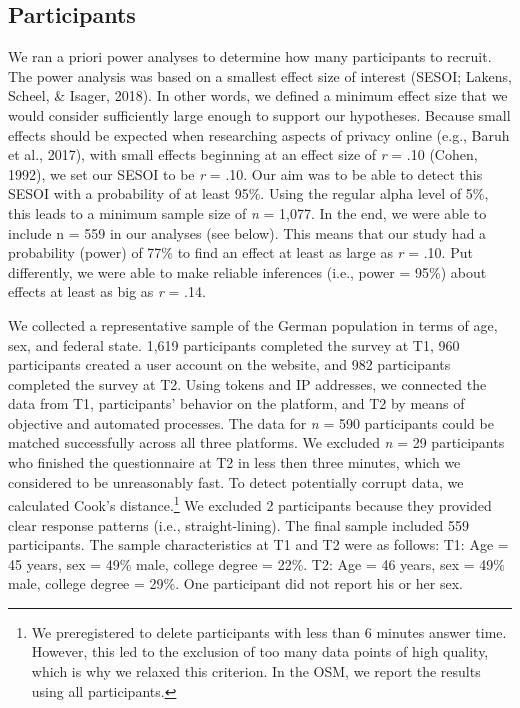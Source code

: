 \documentclass[
  english,
  man,floatsintext]{apa6}
\begin{document}
\hypertarget{participants}{%
\subsection{Participants}\label{participants}}

We ran a priori power analyses to determine how many participants to recruit. The power analysis was based on a smallest effect size of interest (SESOI; Lakens, Scheel, \& Isager, 2018).
In other words, we defined a minimum effect size that we would consider sufficiently large enough to support our hypotheses.
Because small effects should be expected when researching aspects of privacy online (e.g., Baruh et al., 2017), with small effects beginning at an effect size of \emph{r} = .10 (Cohen, 1992), we set our SESOI to be \emph{r} = .10.
Our aim was to be able to detect this SESOI with a probability of at least 95\%. Using the regular alpha level of 5\%, this leads to a minimum sample size of \emph{n} = 1,077.
In the end, we were able to include n = 559 in our analyses (see below).
This means that our study had a probability (power) of 77\% to find an effect at least as large as \emph{r} = .10.
Put differently, we were able to make reliable inferences (i.e., power = 95\%) about effects at least as big as \emph{r} = .14.

We collected a representative sample of the German population in terms of age, sex, and federal state.
1,619 participants completed the survey at T1, 960 participants created a user account on the website, and 982 participants completed the survey at T2.
Using tokens and IP addresses, we connected the data from T1, participants' behavior on the platform, and T2 by means of objective and automated processes.
The data for \emph{n} = 590 participants could be matched successfully across all three platforms.
We excluded \emph{n} = 29 participants who finished the questionnaire at T2 in less then three minutes, which we considered to be unreasonably fast.
To detect potentially corrupt data, we calculated Cook's distance.\footnote{We preregistered to delete participants with less than 6 minutes answer time. However, this led to the exclusion of too many data points of high quality, which is why we relaxed this criterion. In the OSM, we report the results using all participants.}
We excluded 2 participants because they provided clear response patterns (i.e., straight-lining).
The final sample included 559 participants.
The sample characteristics at T1 and T2 were as follows:
T1: Age = 45 years, sex = 49\% male, college degree = 22\%.
T2: Age = 46 years, sex = 49\% male, college degree = 29\%.
One participant did not report his or her sex.
\end{document}
